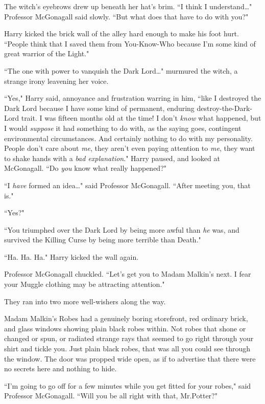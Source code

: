 The witch's eyebrows drew up beneath her hat's brim. ``I think I understand{\ldots}" Professor McGonagall said slowly. ``But what does that have to do with you?"

Harry kicked the brick wall of the alley hard enough to make his foot hurt. ``People think that I saved them from You-Know-Who because I'm some kind of great warrior of the Light."

``The one with power to vanquish the Dark Lord{\ldots}" murmured the witch, a strange irony leavening her voice.

``Yes," Harry said, annoyance and frustration warring in him, ``like I destroyed the Dark Lord because I have some kind of permanent, enduring destroy-the-Dark-Lord trait. I was fifteen months old at the time! I don't \emph{know} what happened, but I would \emph{suppose} it had something to do with, as the saying goes, contingent environmental circumstances. And certainly nothing to do with my personality. People don't care about \emph{me}, they aren't even paying attention to \emph{me}, they want to shake hands with a \emph{bad explanation}." Harry paused, and looked at McGonagall. ``Do \emph{you} know what really happened?"

``I \emph{have} formed an idea{\ldots}" said Professor McGonagall. ``After meeting you, that is."

``Yes?"

``You triumphed over the Dark Lord by being more awful than \emph{he} was, and survived the Killing Curse by being more terrible than Death."

``Ha. Ha. Ha." Harry kicked the wall again.

Professor McGonagall chuckled. ``Let's get you to Madam Malkin's next. I fear your Muggle clothing may be attracting attention."

They ran into two more well-wishers along the way.

Madam Malkin's Robes had a genuinely boring storefront, red ordinary brick, and glass windows showing plain black robes within. Not robes that shone or changed or spun, or radiated strange rays that seemed to go right through your shirt and tickle you. Just plain black robes, that was all you could see through the window. The door was propped wide open, as if to advertise that there were no secrets here and nothing to hide.

``I'm going to go off for a few minutes while you get fitted for your robes," said Professor McGonagall. ``Will you be all right with that, Mr.\?Potter?"

